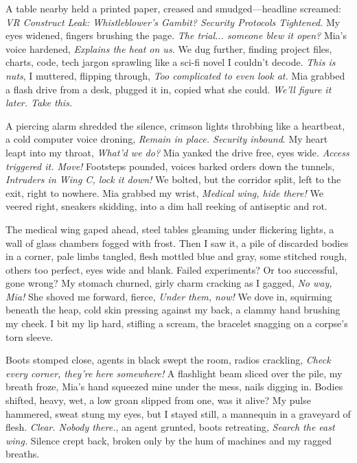 \documentclass[12pt,oneside]{book}
\begin{document}
A table nearby held a printed paper, creased and smudged—headline screamed: \textit{VR Construct Leak: Whistleblower’s Gambit? Security Protocols Tightened.} My eyes widened, fingers brushing the page. \textit{The trial... someone blew it open?} Mia’s voice hardened, \textit{Explains the heat on us.} We dug further, finding project files, charts, code, tech jargon sprawling like a sci-fi novel I couldn’t decode. \textit{This is nuts}, I muttered, flipping through, \textit{Too complicated to even look at.} Mia grabbed a flash drive from a desk, plugged it in, copied what she could. \textit{We’ll figure it later. Take this.}

A piercing alarm shredded the silence, crimson lights throbbing like a heartbeat, a cold computer voice droning, \textit{Remain in place. Security inbound}. My heart leapt into my throat, \textit{What’d we do?} Mia yanked the drive free, eyes wide. \textit{Access triggered it. Move!} Footsteps pounded, voices barked orders down the tunnels, \textit{Intruders in Wing C, lock it down!} We bolted, but the corridor split, left to the exit, right to nowhere. Mia grabbed my wrist, \textit{Medical wing, hide there!} We veered right, sneakers skidding, into a dim hall reeking of antiseptic and rot.

The medical wing gaped ahead, steel tables gleaming under flickering lights, a wall of glass chambers fogged with frost. Then I saw it, a pile of discarded bodies in a corner, pale limbs tangled, flesh mottled blue and gray, some stitched rough, others too perfect, eyes wide and blank. Failed experiments? Or too successful, gone wrong? My stomach churned, girly charm cracking as I gagged, \textit{No way, Mia!} She shoved me forward, fierce, \textit{Under them, now!} We dove in, squirming beneath the heap, cold skin pressing against my back, a clammy hand brushing my cheek. I bit my lip hard, stifling a scream, the bracelet snagging on a corpse’s torn sleeve.

Boots stomped close, agents in black swept the room, radios crackling, \textit{Check every corner, they’re here somewhere!} A flashlight beam sliced over the pile, my breath froze, Mia’s hand squeezed mine under the mess, nails digging in. Bodies shifted, heavy, wet, a low groan slipped from one, was it alive? My pulse hammered, sweat stung my eyes, but I stayed still, a mannequin in a graveyard of flesh. \textit{Clear. Nobody there.}, an agent grunted, boots retreating, \textit{Search the east wing.} Silence crept back, broken only by the hum of machines and my ragged breaths.
\end{document}
